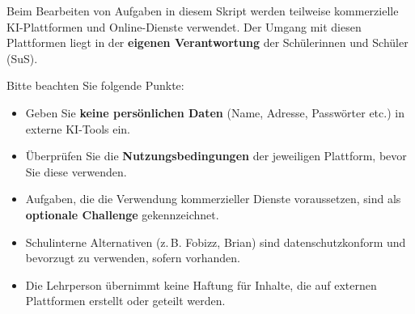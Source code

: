 \begin{mycaution}
Beim Bearbeiten von Aufgaben in diesem Skript werden teilweise kommerzielle KI-Plattformen
und Online-Dienste verwendet. Der Umgang mit diesen Plattformen liegt in der
\textbf{eigenen Verantwortung} der Schülerinnen und Schüler (SuS).

Bitte beachten Sie folgende Punkte:
\begin{itemize}
    \item Geben Sie \textbf{keine persönlichen Daten} (Name, Adresse, Passwörter etc.)
          in externe KI-Tools ein.
    \item Überprüfen Sie die \textbf{Nutzungsbedingungen} der jeweiligen Plattform,
          bevor Sie diese verwenden.
    \item Aufgaben, die die Verwendung kommerzieller Dienste voraussetzen, sind als
          \textbf{optionale Challenge}  gekennzeichnet.
    \item Schulinterne Alternativen (z.\,B. Fobizz, Brian) sind datenschutzkonform
          und bevorzugt zu verwenden, sofern vorhanden.
    \item Die Lehrperson übernimmt keine Haftung für Inhalte, die auf externen
          Plattformen erstellt oder geteilt werden.
\end{itemize}
\end{mycaution}

\clearpage









\clearpage

\appendix


\backmatter
\printbibliography[heading=bibintoc]


